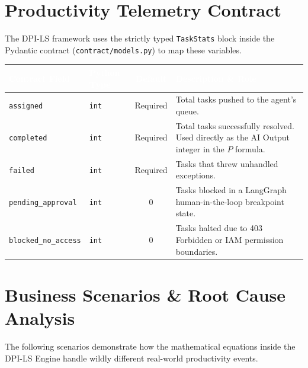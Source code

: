 \documentclass[11pt,a4paper]{article}
\begin{document}
\vspace{1cm}

\section{Productivity Telemetry Contract}

The DPI-LS framework uses the strictly typed \texttt{TaskStats} block inside the Pydantic contract (\texttt{contract/models.py}) to map these variables.

\vspace{0.5cm}
\begin{center}
\renewcommand{\arraystretch}{1.5}
\begin{tabularx}{\textwidth}{@{} l l c X @{}}
\toprule
\rowcolor{dpiblue} 
\textcolor{white}{\textbf{Contract Field}} & \textcolor{white}{\textbf{Python Type}} & \textcolor{white}{\textbf{Default}} & \textcolor{white}{\textbf{Description \& Role}} \\
\midrule
\texttt{assigned} & \texttt{int} & Required & Total tasks pushed to the agent's queue. \\
\rowcolor{dpilight}
\texttt{completed} & \texttt{int} & Required & Total tasks successfully resolved. Used directly as the AI Output integer in the $P$ formula. \\
\texttt{failed} & \texttt{int} & Required & Tasks that threw unhandled exceptions. \\
\rowcolor{dpilight}
\texttt{pending\_approval} & \texttt{int} & $0$ & Tasks blocked in a LangGraph human-in-the-loop breakpoint state. \\
\texttt{blocked\_no\_access} & \texttt{int} & $0$ & Tasks halted due to 403 Forbidden or IAM permission boundaries. \\
\bottomrule
\end{tabularx}
\end{center}
\vspace{0.5cm}
\vspace{1cm}
\section{Business Scenarios \& Root Cause Analysis}

The following scenarios demonstrate how the mathematical equations inside the DPI-LS Engine handle wildly different real-world productivity events.
\end{document}
